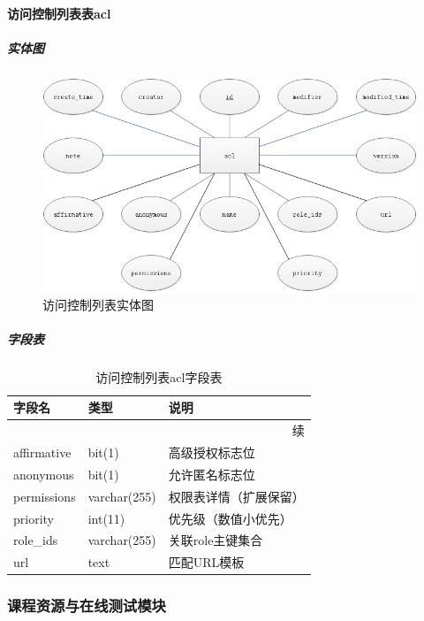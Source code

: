 \documentclass[titlepage,UTF8,linespread=1.5]{ctexart}
\begin{document}
\paragraph{访问控制列表表acl}
\subparagraph{实体图}
\begin{figure}[H]
    \centering
    \includegraphics[width=140mm]{entity-acl.png}
    \caption{访问控制列表实体图}
    \label{fig:entity-acl}
\end{figure}
\subparagraph{字段表}
\begin{longtable}{|p{10em}|p{6em}|p{15em}|}
    \caption{访问控制列表acl字段表}\label{tab:table_acl}   \\\hline
    字段名         & 类型         & 说明                   \\\hline
    \endfirsthead
    \multicolumn{3}{r}{{续\tablename\thetable{}}}          \\\hline
    \endhead
    affirmative    & bit(1)       & 高级授权标志位         \\\hline
    anonymous      & bit(1)       & 允许匿名标志位         \\\hline
    permissions    & varchar(255) & 权限表详情（扩展保留） \\\hline
    priority       & int(11)      & 优先级（数值小优先）   \\\hline
    role\_ids      & varchar(255) & 关联role主键集合       \\\hline
    url            & text         & 匹配URL模板            \\\hline
\end{longtable}\par

\subsubsection{课程资源与在线测试模块}
\end{document}
